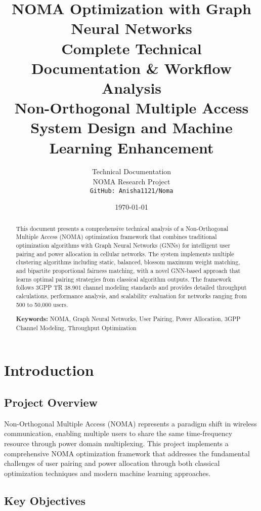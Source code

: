 \documentclass[11pt,a4paper]{article}
\title{
    \vspace{-2cm}
    {\Huge \textbf{NOMA Optimization with Graph Neural Networks}} \\
    \vspace{0.5cm}
    {\Large Complete Technical Documentation \& Workflow Analysis} \\
    \vspace{0.5cm}
    {\large Non-Orthogonal Multiple Access System Design and Machine Learning Enhancement}
}
\author{
    Technical Documentation \\
    NOMA Research Project \\
    \texttt{GitHub: Anisha1121/Noma}
}
\date{\today}
\begin{document}
\maketitle
\newpage

\tableofcontents
\newpage

\listoffigures
\listoftables
\newpage

\begin{abstract}
This document presents a comprehensive technical analysis of a Non-Orthogonal Multiple Access (NOMA) optimization framework that combines traditional optimization algorithms with Graph Neural Networks (GNNs) for intelligent user pairing and power allocation in cellular networks. The system implements multiple clustering algorithms including static, balanced, blossom maximum weight matching, and bipartite proportional fairness matching, with a novel GNN-based approach that learns optimal pairing strategies from classical algorithm outputs. The framework follows 3GPP TR 38.901 channel modeling standards and provides detailed throughput calculations, performance analysis, and scalability evaluation for networks ranging from 500 to 50,000 users.

\textbf{Keywords:} NOMA, Graph Neural Networks, User Pairing, Power Allocation, 3GPP Channel Modeling, Throughput Optimization
\end{abstract}

\newpage

\section{Introduction}

\subsection{Project Overview}

Non-Orthogonal Multiple Access (NOMA) represents a paradigm shift in wireless communication, enabling multiple users to share the same time-frequency resource through power domain multiplexing. This project implements a comprehensive NOMA optimization framework that addresses the fundamental challenges of user pairing and power allocation through both classical optimization techniques and modern machine learning approaches.

\subsection{Key Objectives}
\end{document}
